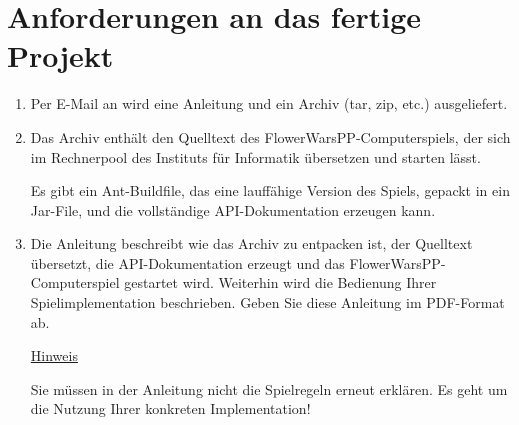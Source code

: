 \section*{Anforderungen an das fertige Projekt}
\begin{enumerate}
\item Per E-Mail an  wird eine Anleitung und ein Archiv (tar, zip, etc.) ausgeliefert.
\item Das Archiv enthält den Quelltext des FlowerWarsPP-Computerspiels, der sich im Rechnerpool des Instituts für Informatik übersetzen und starten lässt.

Es gibt ein Ant-Buildfile, das eine lauffähige Version des Spiels, gepackt in ein Jar-File, und die vollständige API-Dokumentation erzeugen kann.
\item Die Anleitung beschreibt wie das Archiv zu entpacken ist, der Quelltext übersetzt, die API-Dokumentation erzeugt und das FlowerWarsPP-Computerspiel gestartet wird. Weiterhin wird die Bedienung Ihrer Spielimplementation beschrieben. Geben Sie diese Anleitung im PDF-Format ab.

\underline{Hinweis}

Sie müssen in der Anleitung nicht die Spielregeln erneut erklären. Es geht um die Nutzung Ihrer konkreten Implementation!
\end{enumerate}